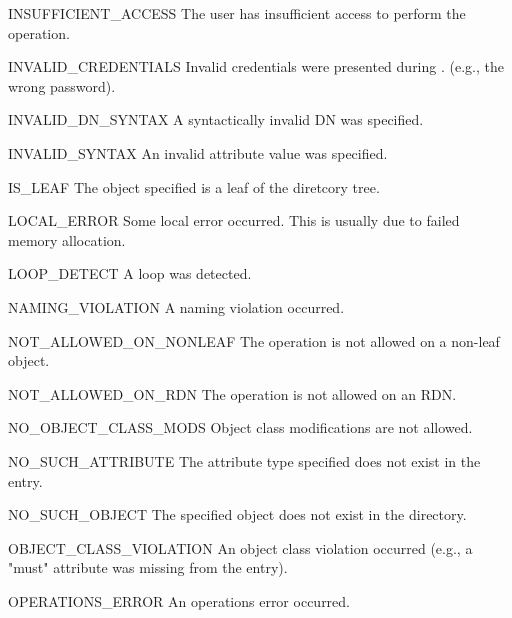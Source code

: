 \begin{excdesc}{INSUFFICIENT_ACCESS}
	   The user has  insufficient  access  to perform the operation.
\end{excdesc}
\begin{excdesc}{INVALID_CREDENTIALS}
	Invalid   credentials  were  presented during .
	(e.g., the wrong password).
\end{excdesc}
\begin{excdesc}{INVALID_DN_SYNTAX}
	   A syntactically invalid DN was  specified.
\end{excdesc}
\begin{excdesc}{INVALID_SYNTAX}
	An  invalid attribute value was specified.
\end{excdesc}
\begin{excdesc}{IS_LEAF}
	The object specified is a leaf of the diretcory tree.
\end{excdesc}
\begin{excdesc}{LOCAL_ERROR}
	Some local error  occurred.
	This is usually due to failed memory allocation.
\end{excdesc}
\begin{excdesc}{LOOP_DETECT}
	A loop was detected.
\end{excdesc}
\begin{excdesc}{NAMING_VIOLATION}
	A naming violation occurred.
\end{excdesc}
\begin{excdesc}{NOT_ALLOWED_ON_NONLEAF}
	The operation is not allowed on a non-leaf object.
\end{excdesc}
\begin{excdesc}{NOT_ALLOWED_ON_RDN}
	The  operation  is  not  allowed on an RDN.
\end{excdesc}
\begin{excdesc}{NO_OBJECT_CLASS_MODS}
	Object  class  modifications  are  not allowed.
\end{excdesc}
\begin{excdesc}{NO_SUCH_ATTRIBUTE}
	The  attribute type specified does not exist in the entry.
\end{excdesc}
\begin{excdesc}{NO_SUCH_OBJECT}
	The specified object does not exist in the directory.
\end{excdesc}
\begin{excdesc}{OBJECT_CLASS_VIOLATION}
	An  object  class  violation  occurred (e.g.,  
	a "must" attribute was missing from the entry).
\end{excdesc}
\begin{excdesc}{OPERATIONS_ERROR}
	An operations error occurred.
\end{excdesc}
